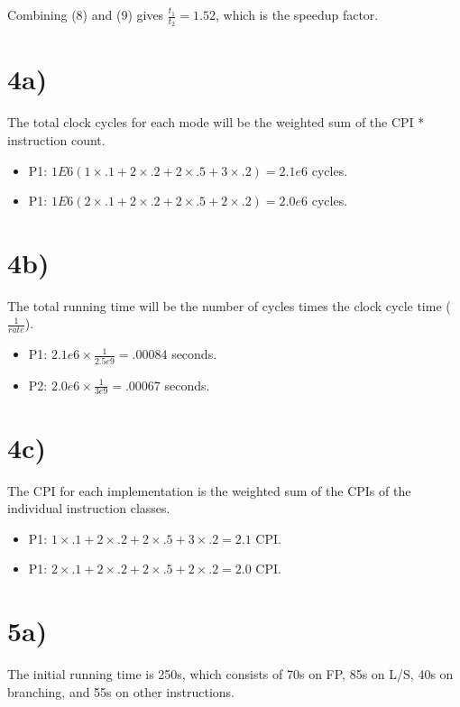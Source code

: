 \documentclass[a4paper,11pt]{article}
\begin{document}
Combining (8) and (9) gives $\frac{t_1}{t_2} = 1.52$, which is the speedup factor.


\section*{4a)}
The total clock cycles for each mode will be the weighted sum of the CPI * instruction count.

\begin{itemize}
	\item P1: $1E6 (1 \times .1 + 2 \times .2 + 2 \times .5 + 3 \times .2) = 2.1e6$ cycles.
	\item P1: $1E6 (2 \times .1 + 2 \times .2 + 2 \times .5 + 2 \times .2) = 2.0e6$ cycles.
\end{itemize}

\section*{4b)}
The total running time will be the number of cycles times the clock cycle time ($\frac{1}{rate}$).

\begin{itemize}
	\item P1: $2.1e6 \times \frac{1}{2.5e9} = .00084$ seconds.
	\item P2: $2.0e6 \times \frac{1}{3e9} = .00067$ seconds.
\end{itemize}


\section*{4c)}
The CPI for each implementation is the weighted sum of the CPIs of the individual instruction classes.

\begin{itemize}
	\item P1: $1 \times .1 + 2 \times .2 + 2 \times .5 + 3 \times .2 = 2.1$ CPI.
	\item P1: $2 \times .1 + 2 \times .2 + 2 \times .5 + 2 \times .2 = 2.0$ CPI.
\end{itemize}


\section*{5a)}
The initial running time is 250s, which consists of 70s on FP, 85s on L/S, 40s on branching, and 55s on other instructions.
\end{document}
